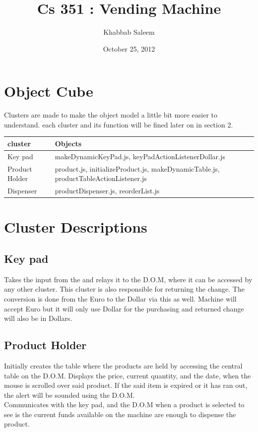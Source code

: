 \documentclass[a4paper,12pt]{article}
\title{Cs 351 : Vending Machine }
\date{October 25, 2012}
\author{Khabbab Saleem}
\begin{document}
\maketitle


\section{Object Cube}

Clusters are made to make the object model a little bit more easier to understand.
each cluster and its function will be fined later on in section 2. 

\begin{center}
\begin{tabular}{l| p{10 cm}}
\hline
cluster & Objects\\
\hline
Key pad & makeDynamicKeyPad.js, keyPadActionListenerDollar.js\\
\hline
Product Holder & product.js, initializeProduct.js, makeDynamicTable.js, productTableActionListener.js\\
\hline
Dispenser  & productDispenser.js, reorderList.js
\end{tabular}
\end{center}

\section{Cluster Descriptions}

\subsection{Key pad}

Takes the input from the  and relays it to the D.O.M, where it can be accessed by any other cluster. This cluster is also responsible for returning the change. The conversion is done from the Euro to the Dollar via this as well. Machine will accept Euro but it will only use Dollar for the purchasing and returned change will also be in Dollars.

\subsection{Product Holder}
    Initially creates the table where the products are held by accessing the central table on the D.O.M. Displays the price, current quantity, and the  date, when the mouse is scrolled over said product. If the said item is expired or it has ran out, the alert will be sounded using the D.O.M. \\
\indent    	Communicates with the key pad, and the D.O.M when a product is selected to see is the current funds available on the machine are enough to dispense the product.
\end{document}
